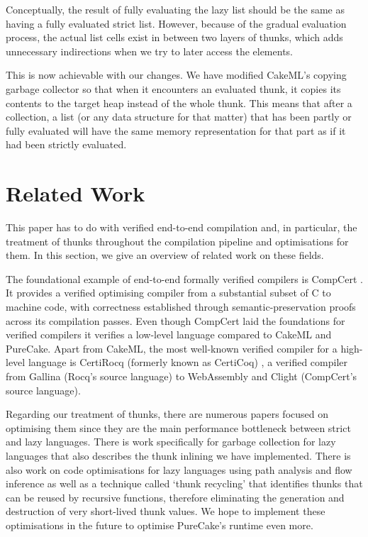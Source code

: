 \documentclass[sigconf]{acmart}
\begin{document}
Conceptually, the result of fully evaluating the lazy list should be the same as
having a fully evaluated strict list. However, because of the gradual evaluation
process, the actual list cells exist in between two layers of thunks, which adds
unnecessary indirections when we try to later access the elements.

This is now achievable with our changes. We have modified CakeML's copying
garbage collector so that when it encounters an evaluated thunk, it copies its
contents to the target heap instead of the whole thunk. This means that after a
collection, a list (or any data structure for that matter) that has been partly
or fully evaluated will have the same memory representation for that part as if
it had been strictly evaluated.

\section{Related Work}
\label{sec:related-work}
This paper has to do with verified end-to-end compilation and, in particular,
the treatment of thunks throughout the compilation pipeline and optimisations
for them. In this section, we give an overview of related work on these fields.

The foundational example of end-to-end formally verified compilers is CompCert
\cite{compcert}. It provides a verified optimising compiler from a substantial
subset of C to machine code, with correctness established through
semantic-preservation proofs across its compilation passes. Even though CompCert
laid the foundations for verified compilers it verifies a low-level language
compared to CakeML and PureCake. Apart from CakeML, the most well-known verified
compiler for a high-level language is CertiRocq (formerly known as CertiCoq)
\cite{certicoq}, a verified compiler from Gallina (Rocq's source language) to
WebAssembly and Clight (CompCert's source language).

Regarding our treatment of thunks, there are numerous papers focused on
optimising them since they are the main performance bottleneck between strict
and lazy languages. There is work specifically for garbage collection for lazy
languages \cite{lazygc} that also describes the thunk inlining we have
implemented. There is also work on code optimisations for lazy languages using
path analysis \cite{optsforthunks} and flow inference \cite{thunksflow} as well
as a technique called `thunk recycling' \cite{thunk-recycling} that identifies
thunks that can be reused by recursive functions, therefore eliminating the
generation and destruction of very short-lived thunk values. We hope to
implement these optimisations in the future to optimise PureCake's runtime even
more.
\end{document}
